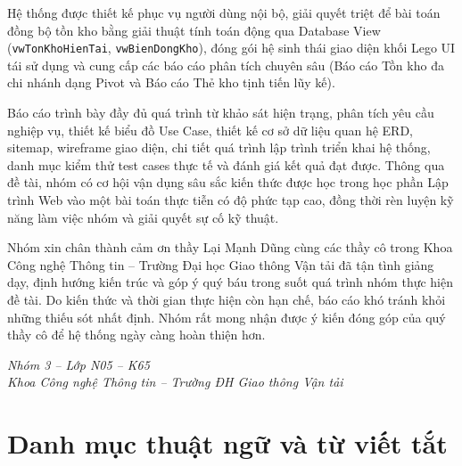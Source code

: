 \documentclass[12pt,a4paper]{report}
\renewcommand{\_}{\textunderscore\allowbreak}
\begin{document}
Hệ thống được thiết kế phục vụ người dùng nội bộ, giải quyết triệt để bài toán đồng bộ tồn kho bằng giải thuật tính toán động qua Database View (\texttt{vw\_TonKhoHienTai}, \texttt{vw\_BienDongKho}), đóng gói hệ sinh thái giao diện khối Lego UI tái sử dụng và cung cấp các báo cáo phân tích chuyên sâu (Báo cáo Tồn kho đa chi nhánh dạng Pivot và Báo cáo Thẻ kho tịnh tiến lũy kế).

Báo cáo trình bày đầy đủ quá trình từ khảo sát hiện trạng, phân tích yêu cầu nghiệp vụ, thiết kế biểu đồ Use Case, thiết kế cơ sở dữ liệu quan hệ ERD, sitemap, wireframe giao diện, chi tiết quá trình lập trình triển khai hệ thống, danh mục kiểm thử test cases thực tế và đánh giá kết quả đạt được. Thông qua đề tài, nhóm có cơ hội vận dụng sâu sắc kiến thức được học trong học phần Lập trình Web vào một bài toán thực tiễn có độ phức tạp cao, đồng thời rèn luyện kỹ năng làm việc nhóm và giải quyết sự cố kỹ thuật.

Nhóm xin chân thành cảm ơn thầy Lại Mạnh Dũng cùng các thầy cô trong Khoa Công nghệ Thông tin -- Trường Đại học Giao thông Vận tải đã tận tình giảng dạy, định hướng kiến trúc và góp ý quý báu trong suốt quá trình nhóm thực hiện đề tài. Do kiến thức và thời gian thực hiện còn hạn chế, báo cáo khó tránh khỏi những thiếu sót nhất định. Nhóm rất mong nhận được ý kiến đóng góp của quý thầy cô để hệ thống ngày càng hoàn thiện hơn.

\begin{flushright}
    \textit{Nhóm 3 -- Lớp N05 -- K65}\\
    \textit{Khoa Công nghệ Thông tin -- Trường ĐH Giao thông Vận tải}
\end{flushright}

\cleardoublepage

\section*{Danh mục thuật ngữ và từ viết tắt}
\end{document}
